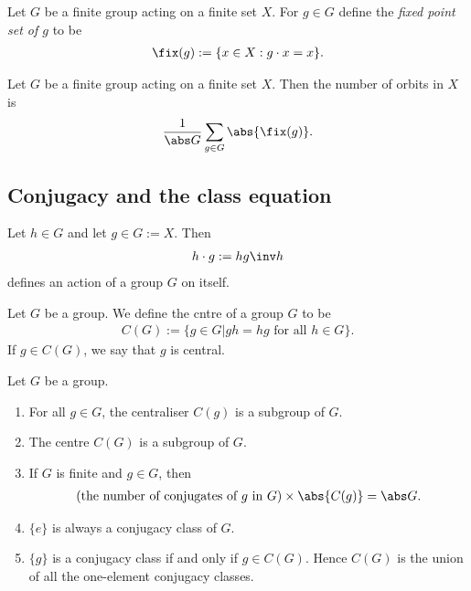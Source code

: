 \documentclass{article}
\begin{document}
\begin{definition}
    Let $G$ be a finite group acting on a finite set $X$. For $g\in G$
    define the \emph{fixed point set of $g$} to be
    \begin{align*}
        \fix(g) := \{x\in X : g\cdot x = x\}.
    \end{align*}
\end{definition}

\begin{theorem}
    Let $G$ be a finite group acting on a finite set $X$. Then
    the number of orbits in $X$ is
    \begin{align*}
        \frac{1}{\abs G} \sum_{g\in G} \abs{\fix(g)}.
    \end{align*}
\end{theorem}

\subsection{Conjugacy and the class equation}

\begin{lemma}
    Let $h\in G$ and let $g\in G := X$. Then
    \begin{align*}
        h\cdot g := hg\inv h
    \end{align*}
    defines an action of a group $G$ on itself.
\end{lemma}

\setcounter{theorem}{3}
\begin{definition}
    Let $G$ be a group. We define the cntre of a group $G$ to be
    \begin{align*}
        C(G) := \{g\in G | gh = hg \text{ for all } h\in G\}.
    \end{align*}
    If $g\in C(G)$, we say that $g$ is central.
\end{definition}

\setcounter{theorem}{5}
\begin{corollary}
    Let $G$ be a group.
    \begin{enumerate}
        \item For all $g\in G$, the centraliser $C(g)$ is a subgroup of $G$.
        \item The centre $C(G)$ is a subgroup of $G$.
        \item If $G$ is finite and $g\in G$, then \begin{align*}
                  (\text{the number of conjugates of $g$ in $G$})\times
                  \abs{C(g)} = \abs G.
              \end{align*}
        \item $\{e\}$ is always a conjugacy class of $G$.
        \item $\{g\}$ is a conjugacy class if and only if $g\in C(G)$. Hence
              $C(G)$ is the union of all the one-element conjugacy classes.
    \end{enumerate}
\end{corollary}
\end{document}
